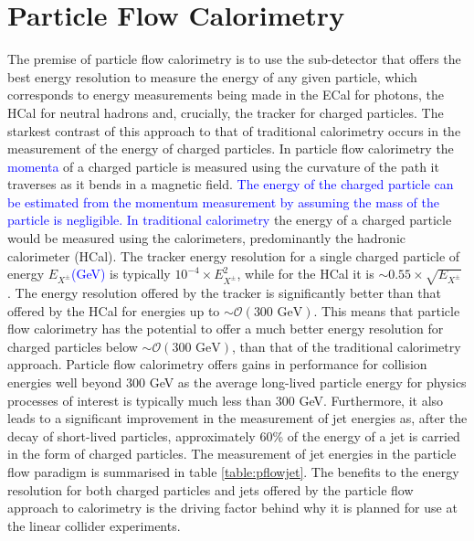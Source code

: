 \section{Particle Flow Calorimetry}
The premise of particle flow calorimetry is to use the sub-detector that offers the best energy resolution to measure the energy of any given particle, which corresponds to energy measurements being made in the ECal for photons, the HCal for neutral hadrons and, crucially, the tracker for charged particles.  The starkest contrast of this approach to that of traditional calorimetry occurs in the measurement of the energy of charged particles.  In particle flow calorimetry the \textcolor{blue}{momenta} of a charged particle is measured using the curvature of the path it traverses as it bends in a magnetic field. \textcolor{blue}{The energy of the charged particle can be estimated from the momentum measurement by assuming the mass of the particle is negligible.  In traditional calorimetry} the energy of a charged particle would be measured using the calorimeters, predominantly the hadronic calorimeter (HCal).  The tracker energy resolution for a single charged particle of energy $E_{X^{\pm}}$\textcolor{blue}{(GeV)} is typically $10^{-4} \times E_{X^{\pm}}^{2}$, while for the HCal it is $\sim 0.55 \times \sqrt{E_{X^{\pm}}}$ \cite{arXiv:0907.3577}.  The energy resolution offered by the tracker is significantly better than that offered by the HCal for energies up to $\sim \mathcal{O}(300 \text{ GeV})$.  This means that particle flow calorimetry has the potential to offer a much better energy resolution for charged particles below $\sim \mathcal{O}(300 \text{ GeV})$, than that of the traditional calorimetry approach.  Particle flow calorimetry offers gains in performance for collision energies well beyond 300 GeV as the average long-lived particle energy for physics processes of interest is typically much less than 300 GeV.  Furthermore, it also leads to a significant improvement in the measurement of jet energies as, after the decay of short-lived particles, approximately 60\% of the energy of a jet is carried in the form of charged particles.  The measurement of jet energies in the particle flow paradigm is summarised in table \ref{table:pflowjet}.  The benefits to the energy resolution for both charged particles and jets offered by the particle flow approach to calorimetry is the driving factor behind why it is planned for use at the linear collider experiments.  

